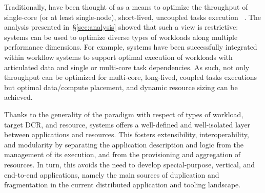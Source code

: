 \documentclass{sig-alternate}
\begin{document}



Traditionally, \pilots have been thought of as a means to optimize the
throughput of single-core (or at least single-node), short-lived, uncoupled
tasks execution ~\cite{pordes2007,sfiligoi2009,juve2010}. The analysis presented
in~\S\ref{sec:analysis} showed that such a view is restrictive: \pilot systems
can be used to optimize diverse types of workloads along multiple performance
dimensions. For example, \pilot systems have been successfully integrated within
workflow systems to support optimal execution of workloads with articulated data
and single or multi-core task dependencies. As such, not only throughput can be
optimized for multi-core, long-lived, coupled tasks executions but optimal
data/compute placement, and dynamic resource sizing can be achieved.



Thanks to the generality of the \pilot paradigm with respect of types of workload,
target DCR, and resource, \pilot systems offers a well-defined and well-isolated
layer between applications and resources. This fosters extensibility,
interoperability, and modularity by separating the application description and
logic from the management of its execution, and from the provisioning and
aggregation of resources. In turn, this avoids the need to develop
special-purpose, vertical, and end-to-end applications, namely the main sources
of duplication and fragmentation in the current distributed application and
tooling landscape. 
\end{document}
